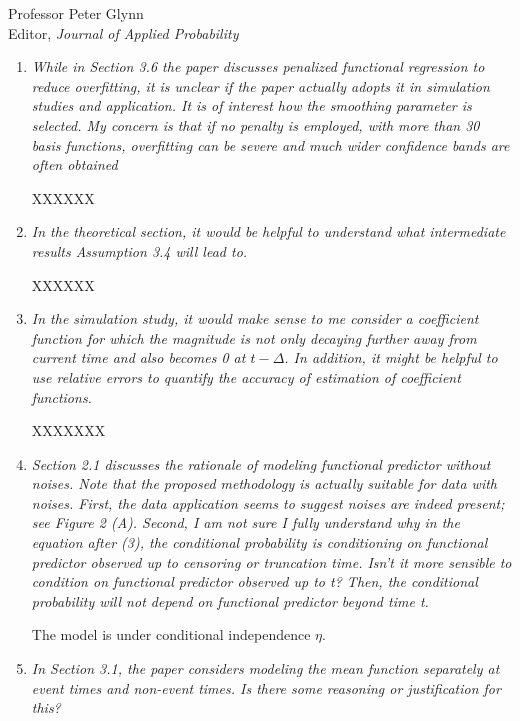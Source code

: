 \documentclass[11pt]{letter} %
\begin{document}
\begin{letter}{Professor
	Peter Glynn\\
	Editor, {\em Journal of Applied Probability}}
\begin{enumerate}
\item {\it While in Section 3.6 the paper discusses penalized functional regression to reduce overfitting, it is unclear if the paper actually adopts it in simulation studies and application. It is of interest how the smoothing parameter is selected. My concern is that if no penalty is employed, with more than 30 basis functions, overfitting can be severe and much wider confidence bands are often obtained}

\vspace{5mm}
XXXXXX
\vspace{5mm}

\item {\it In the theoretical section, it would be helpful to understand what intermediate results Assumption 3.4 will lead to.}

\vspace{5mm}
XXXXXX
\vspace{5mm}

\item {\it In the simulation study, it would make sense to me consider a coefficient function for which the magnitude is not only decaying further away from current time and also becomes 0 at $t-\Delta$. In addition, it might be helpful to use relative errors to quantify the accuracy of estimation of coefficient functions.}

\vspace{5mm}
XXXXXXX
\vspace{5mm}

\item {\it Section 2.1 discusses the rationale of modeling functional predictor without noises. Note that the proposed methodology is actually suitable for data with noises. First, the data application seems to suggest noises are indeed present; see Figure 2 (A). Second, I am not sure I fully understand why in the equation after (3), the conditional probability is conditioning on functional predictor observed up to censoring or truncation time. Isn’t it more sensible to condition on functional predictor observed up to t? Then, the conditional probability will not depend on functional predictor beyond time t.}

\vspace{5mm}
The model is under conditional independence $\eta$.
\vspace{5mm}


\item {\it In Section 3.1, the paper considers modeling the mean function separately at event times and non-event times. Is there some reasoning or justification for this?}


\end{enumerate}
\end{letter}
\end{document}

